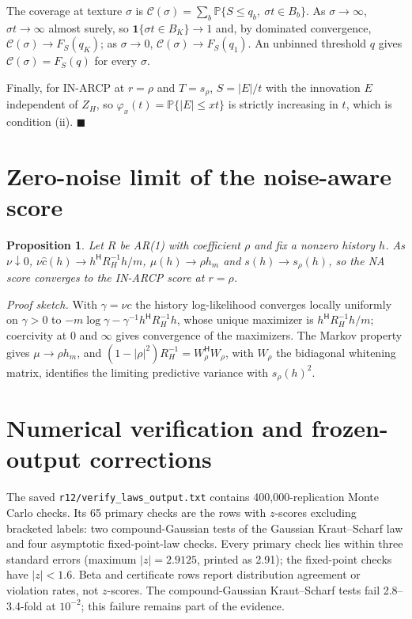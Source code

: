 \documentclass[10pt]{article}
\newtheorem{propS}{Proposition}
\begin{document}
The coverage at texture $\sigma$ is $\mathcal C(\sigma)=\sum_b\mathbb{P}\{S\le q_b,\ \sigma t\in B_b\}$. As $\sigma\to\infty$, $\sigma t\to\infty$ almost surely, so $\mathbf 1\{\sigma t\in B_K\}\to1$ and, by dominated convergence, $\mathcal C(\sigma)\to F_S(q_K)$; as $\sigma\to0$, $\mathcal C(\sigma)\to F_S(q_1)$. An unbinned threshold $q$ gives $\mathcal C(\sigma)=F_S(q)$ for every $\sigma$.

Finally, for IN-ARCP at $r=\rho$ and $T=s_\rho$, $S=|E|/t$ with the innovation $E$ independent of $Z_H$, so $\varphi_x(t)=\mathbb{P}\{|E|\le xt\}$ is strictly increasing in $t$, which is condition (ii). \hfill$\blacksquare$

\section{Zero-noise limit of the noise-aware score}
\begin{propS}\label{prop:reduce}
Let $R$ be AR(1) with coefficient $\rho$ and fix a nonzero history $h$. As $\nu\downarrow0$, $\nu\widehat c(h)\to h^{\mathsf H}R_H^{-1}h/m$, $\mu(h)\to\rho h_m$ and $s(h)\to s_\rho(h)$, so the NA score converges to the IN-ARCP score at $r=\rho$.
\end{propS}
\emph{Proof sketch.}
With $\gamma=\nu c$ the history log-likelihood converges locally uniformly on $\gamma>0$ to $-m\log\gamma-\gamma^{-1}h^{\mathsf H}R_H^{-1}h$, whose unique maximizer is $h^{\mathsf H}R_H^{-1}h/m$; coercivity at $0$ and $\infty$ gives convergence of the maximizers. The Markov property gives $\mu\to\rho h_m$, and $(1-|\rho|^2)R_H^{-1}=W_\rho^{\mathsf H}W_\rho$, with $W_\rho$ the bidiagonal whitening matrix, identifies the limiting predictive variance with $s_\rho(h)^2$.



\section{Numerical verification and frozen-output corrections}\label{sup:indep}\label{sup:r12}
The saved \texttt{r12/verify\_laws\_output.txt} contains 400,000-replication Monte Carlo checks. Its 65 primary checks are the rows with $z$-scores excluding bracketed labels: two compound-Gaussian tests of the Gaussian Kraut--Scharf law and four asymptotic fixed-point-law checks. Every primary check lies within three standard errors (maximum $|z|=2.9125$, printed as 2.91); the fixed-point checks have $|z|<1.6$. Beta and certificate rows report distribution agreement or violation rates, not $z$-scores. The compound-Gaussian Kraut--Scharf tests fail 2.8--3.4-fold at $10^{-2}$; this failure remains part of the evidence.
\end{document}
